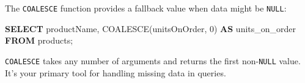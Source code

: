 \documentclass[
  letterpaper,
  DIV=11,
  numbers=noendperiod]{scrreprt}
\newenvironment{Shaded}{\begin{snugshade}}{\end{snugshade}}
\newcommand{\DecValTok}[1]{\textcolor[rgb]{0.68,0.00,0.00}{#1}}
\newcommand{\FunctionTok}[1]{\textcolor[rgb]{0.28,0.35,0.67}{#1}}
\newcommand{\KeywordTok}[1]{\textcolor[rgb]{0.00,0.23,0.31}{\textbf{#1}}}
\newcommand{\NormalTok}[1]{\textcolor[rgb]{0.00,0.23,0.31}{#1}}
\begin{document}
The \texttt{COALESCE} function provides a fallback value when data might
be \texttt{NULL}:

\begin{codelisting}

\caption{\texttt{duckdb}}

\begin{Shaded}
\begin{Highlighting}[]
\KeywordTok{SELECT}
\NormalTok{    productName,}
    \FunctionTok{COALESCE}\NormalTok{(unitsOnOrder, }\DecValTok{0}\NormalTok{) }\KeywordTok{AS}\NormalTok{ units\_on\_order}
\KeywordTok{FROM}\NormalTok{ products;}
\end{Highlighting}
\end{Shaded}

\end{codelisting}

\texttt{COALESCE} takes any number of arguments and returns the first
non-\texttt{NULL} value. It's your primary tool for handling missing
data in queries.
\end{document}
